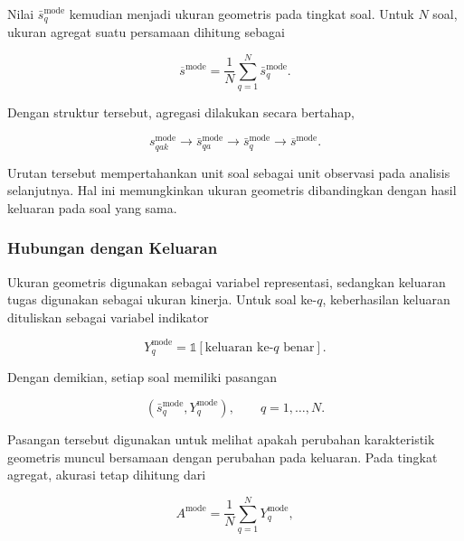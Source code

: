 Nilai $\bar{s}_{q}^{\mathrm{mode}}$ kemudian menjadi ukuran geometris pada
tingkat soal. Untuk $N$ soal, ukuran agregat suatu persamaan dihitung sebagai

\begin{equation}
    \overline{s}^{\mathrm{mode}}
    =
    \frac{1}{N}
    \sum_{q=1}^{N}
    \bar{s}_{q}^{\mathrm{mode}}.
    \label{eq:geo-agregasi-soal}
\end{equation}

Dengan struktur tersebut, agregasi dilakukan secara bertahap,

\begin{equation}
    s_{qak}^{\mathrm{mode}}
    \longrightarrow
    \bar{s}_{qa}^{\mathrm{mode}}
    \longrightarrow
    \bar{s}_{q}^{\mathrm{mode}}
    \longrightarrow
    \overline{s}^{\mathrm{mode}}.
    \label{eq:geo-hierarchical-aggregation}
\end{equation}

Urutan tersebut mempertahankan unit soal sebagai unit observasi pada analisis
selanjutnya. Hal ini memungkinkan ukuran geometris dibandingkan dengan hasil
keluaran pada soal yang sama.

\subsubsection{Hubungan dengan Keluaran}

Ukuran geometris digunakan sebagai variabel representasi, sedangkan keluaran
tugas digunakan sebagai ukuran kinerja. Untuk soal ke-$q$, keberhasilan
keluaran dituliskan sebagai variabel indikator

\begin{equation}
    Y_q^{\mathrm{mode}}
    =
    \mathbb{1}
    \left[
        \text{keluaran ke-$q$ benar}
    \right].
    \label{eq:geo-output-indicator}
\end{equation}

Dengan demikian, setiap soal memiliki pasangan

\begin{equation}
    \left(
        \bar{s}_{q}^{\mathrm{mode}},
        Y_q^{\mathrm{mode}}
    \right),
    \qquad
    q=1,\ldots,N.
    \label{eq:geo-output-pair}
\end{equation}

Pasangan tersebut digunakan untuk melihat apakah perubahan karakteristik
geometris muncul bersamaan dengan perubahan pada keluaran. Pada tingkat
agregat, akurasi tetap dihitung dari

\begin{equation}
    A^{\mathrm{mode}}
    =
    \frac{1}{N}
    \sum_{q=1}^{N}
    Y_q^{\mathrm{mode}},
    \label{eq:geo-accuracy}
\end{equation}

